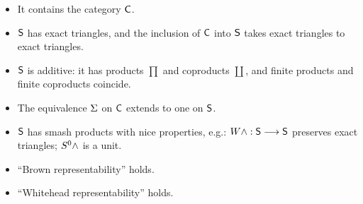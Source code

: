 \begin{itemize}
\item It contains the category $\mathsf{C}$.
\item $\mathsf{S}$ has exact triangles, and the inclusion of $\mathsf{C}$ into $\mathsf{S}$ takes exact triangles to exact triangles.
\item $\mathsf{S}$ is additive: it has products $\prod$ and coproducts $\coprod$, and finite products and finite coproducts coincide.
\item The equivalence $\Sigma$ on $\mathsf{C}$ extends to one on $\mathsf{S}$.
\item $\mathsf{S}$ has smash products with nice properties, e.g.: $W \wedge: \mathsf{S} \longrightarrow \mathsf{S}$ preserves exact triangles; $S^0 \wedge$ is a unit.
\item ``Brown representability'' holds.
\item ``Whitehead representability'' holds.
\end{itemize}

